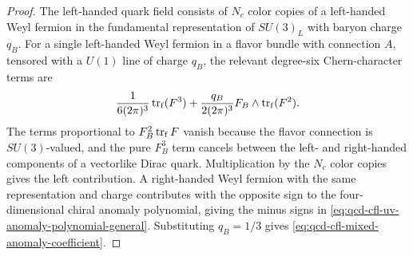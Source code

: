 \begin{proof}
The left-handed quark field consists of \(N_c\) color copies of a
left-handed Weyl fermion in the fundamental representation of \(SU(3)_L\)
with baryon charge \(q_B\).  For a single left-handed Weyl fermion in a
flavor bundle with connection \(A\), tensored with a \(U(1)\) line of charge
\(q_B\), the relevant degree-six Chern-character terms are
\begin{equation}
  \frac{1}{6(2\pi)^3}\operatorname{tr}_{\rm f}(F^3)
  +
  \frac{q_B}{2(2\pi)^3}F_B\wedge\operatorname{tr}_{\rm f}(F^2).
  \label{eq:qcd-cfl-single-weyl-anomaly-character}
\end{equation}
The terms proportional to
\(F_B^2\operatorname{tr}_{\rm f}F\) vanish because the flavor connection is
\(SU(3)\)-valued, and the pure \(F_B^3\) term cancels between the left- and
right-handed components of a vectorlike Dirac quark.  Multiplication by the
\(N_c\) color copies gives the left contribution.  A right-handed Weyl
fermion with the same representation and charge contributes with the
opposite sign to the four-dimensional chiral anomaly polynomial, giving the
minus signs in \eqref{eq:qcd-cfl-uv-anomaly-polynomial-general}.  Substituting
\(q_B=1/3\) gives \eqref{eq:qcd-cfl-mixed-anomaly-coefficient}.
\end{proof}

